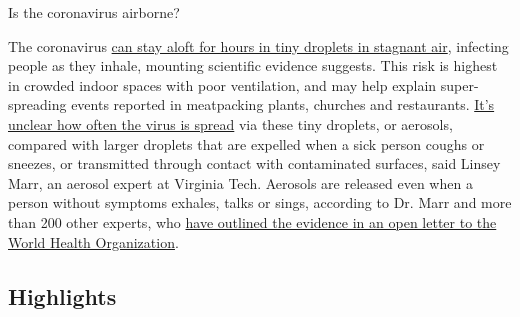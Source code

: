  Is the coronavirus airborne?

The coronavirus
\href{https://www.nytimes.com/2020/07/04/health/239-experts-with-one-big-claim-the-coronavirus-is-airborne.html}{can
stay aloft for hours in tiny droplets in stagnant air}, infecting people
as they inhale, mounting scientific evidence suggests. This risk is
highest in crowded indoor spaces with poor ventilation, and may help
explain super-spreading events reported in meatpacking plants, churches
and restaurants.
\href{https://www.nytimes.com/2020/07/06/health/coronavirus-airborne-aerosols.html}{It's
unclear how often the virus is spread} via these tiny droplets, or
aerosols, compared with larger droplets that are expelled when a sick
person coughs or sneezes, or transmitted through contact with
contaminated surfaces, said Linsey Marr, an aerosol expert at Virginia
Tech. Aerosols are released even when a person without symptoms exhales,
talks or sings, according to Dr. Marr and more than 200 other experts,
who
\href{https://academic.oup.com/cid/article/doi/10.1093/cid/ciaa939/5867798}{have
outlined the evidence in an open letter to the World Health
Organization}.

\hypertarget{highlights}{%
\subsection{Highlights}\label{highlights}}

